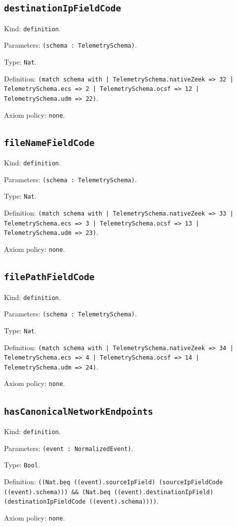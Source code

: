 \documentclass[11pt]{article}
\begin{document}
\subsection*{\texttt{destinationIpFieldCode}}
\noindent Kind: \texttt{definition}.\par
\noindent Parameters: \texttt{(schema : TelemetrySchema)}.\par
\noindent Type: \texttt{Nat}.\par
\noindent Definition: \texttt{(match schema with | TelemetrySchema.nativeZeek => 32 | TelemetrySchema.ecs => 2 | TelemetrySchema.ocsf => 12 | TelemetrySchema.udm => 22)}.\par
\noindent Axiom policy: \texttt{none}.\par
\subsection*{\texttt{fileNameFieldCode}}
\noindent Kind: \texttt{definition}.\par
\noindent Parameters: \texttt{(schema : TelemetrySchema)}.\par
\noindent Type: \texttt{Nat}.\par
\noindent Definition: \texttt{(match schema with | TelemetrySchema.nativeZeek => 33 | TelemetrySchema.ecs => 3 | TelemetrySchema.ocsf => 13 | TelemetrySchema.udm => 23)}.\par
\noindent Axiom policy: \texttt{none}.\par
\subsection*{\texttt{filePathFieldCode}}
\noindent Kind: \texttt{definition}.\par
\noindent Parameters: \texttt{(schema : TelemetrySchema)}.\par
\noindent Type: \texttt{Nat}.\par
\noindent Definition: \texttt{(match schema with | TelemetrySchema.nativeZeek => 34 | TelemetrySchema.ecs => 4 | TelemetrySchema.ocsf => 14 | TelemetrySchema.udm => 24)}.\par
\noindent Axiom policy: \texttt{none}.\par
\subsection*{\texttt{hasCanonicalNetworkEndpoints}}
\noindent Kind: \texttt{definition}.\par
\noindent Parameters: \texttt{(event : NormalizedEvent)}.\par
\noindent Type: \texttt{Bool}.\par
\noindent Definition: \texttt{((Nat.beq ((event).sourceIpField) (sourceIpFieldCode ((event).schema))) \&\& (Nat.beq ((event).destinationIpField) (destinationIpFieldCode ((event).schema))))}.\par
\noindent Axiom policy: \texttt{none}.\par
\end{document}
